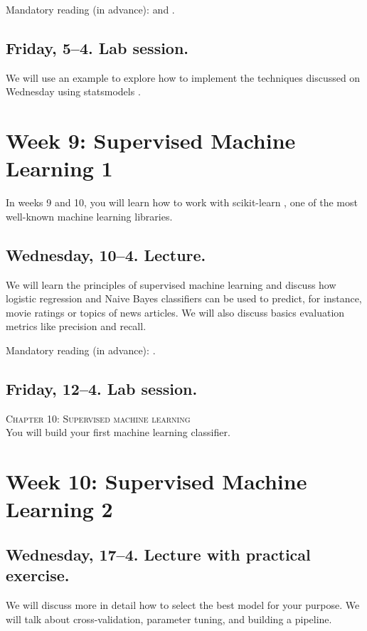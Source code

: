 Mandatory reading (in advance): \cite{Vliegenthart2014} and \cite{Strycharz2018}.


\subsection*{Friday, 5--4. Lab session.}
We will use an example to explore how to implement the techniques discussed on Wednesday using statsmodels \citep{statsmodels}.



\section*{Week 9: Supervised Machine Learning 1}
In weeks 9 and 10, you will learn how to work with scikit-learn \citep{scikit-learn}, one of the most well-known machine learning libraries.


\subsection*{Wednesday, 10--4. Lecture.}
We will learn the principles of supervised machine learning and discuss how logistic regression and Naive Bayes classifiers can be used to predict, for instance, movie ratings or topics of news articles. We will also discuss basics evaluation metrics like precision and recall.

Mandatory reading (in advance): \cite{burscher2014}. 

\subsection*{Friday, 12--4. Lab session.}
\textsc{ Chapter 10: Supervised machine learning}\\
You will build your first machine learning classifier.



\section*{Week 10: Supervised Machine Learning 2}

\subsection*{Wednesday, 17--4. Lecture with practical exercise.}
We will discuss more in detail how to select the best model for your purpose. We will talk about cross-validation, parameter tuning, and building a pipeline.

